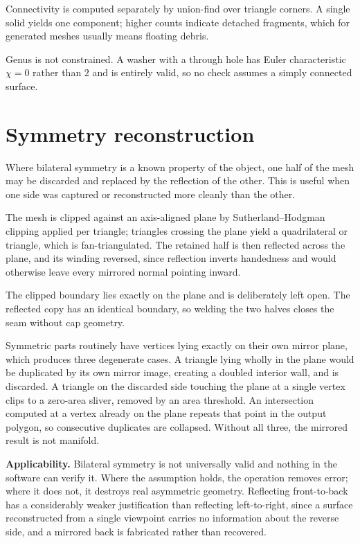 \documentclass[11pt, a4paper]{article}
\begin{document}
Connectivity is computed separately by union-find over triangle corners. A
single solid yields one component; higher counts indicate detached fragments,
which for generated meshes usually means floating debris.

Genus is not constrained. A washer with a through hole has Euler characteristic
$\chi = 0$ rather than $2$ and is entirely valid, so no check assumes a
simply connected surface.

\section{Symmetry reconstruction}

Where bilateral symmetry is a known property of the object, one half of the
mesh may be discarded and replaced by the reflection of the other. This is
useful when one side was captured or reconstructed more cleanly than the other.

The mesh is clipped against an axis-aligned plane by Sutherland--Hodgman
clipping applied per triangle; triangles crossing the plane yield a
quadrilateral or triangle, which is fan-triangulated. The retained half is then
reflected across the plane, and its winding reversed, since reflection inverts
handedness and would otherwise leave every mirrored normal pointing inward.

The clipped boundary lies exactly on the plane and is deliberately left open.
The reflected copy has an identical boundary, so welding the two halves closes
the seam without cap geometry.

Symmetric parts routinely have vertices lying exactly on their own mirror
plane, which produces three degenerate cases. A triangle lying wholly in the
plane would be duplicated by its own mirror image, creating a doubled interior
wall, and is discarded. A triangle on the discarded side touching the plane at
a single vertex clips to a zero-area sliver, removed by an area threshold. An
intersection computed at a vertex already on the plane repeats that point in
the output polygon, so consecutive duplicates are collapsed. Without all three,
the mirrored result is not manifold.

\textbf{Applicability.} Bilateral symmetry is not universally valid and nothing
in the software can verify it. Where the assumption holds, the operation
removes error; where it does not, it destroys real asymmetric geometry.
Reflecting front-to-back has a considerably weaker justification than
reflecting left-to-right, since a surface reconstructed from a single viewpoint
carries no information about the reverse side, and a mirrored back is
fabricated rather than recovered.
\end{document}
